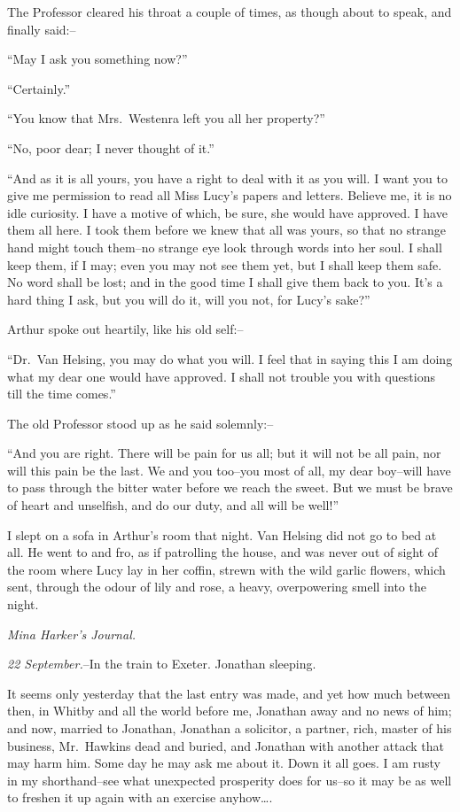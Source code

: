 \documentclass[12pt,openright]{book}
\begin{document}
The Professor cleared his throat a couple of times, as though about to speak, and finally said:–

“May I ask you something now?”

“Certainly.”

“You know that Mrs. Westenra left you all her property?”

“No, poor dear; I never thought of it.”

“And as it is all yours, you have a right to deal with it as you will. I want you to give me permission to read all Miss Lucy’s papers and letters. Believe me, it is no idle curiosity. I have a motive of which, be sure, she would have approved. I have them all here. I took them before we knew that all was yours, so that no strange hand might touch them–no strange eye look through words into her soul. I shall keep them, if I may; even you may not see them yet, but I shall keep them safe. No word shall be lost; and in the good time I shall give them back to you. It’s a hard thing I ask, but you will do it, will you not, for Lucy’s sake?”

Arthur spoke out heartily, like his old self:–

“Dr. Van Helsing, you may do what you will. I feel that in saying this I am doing what my dear one would have approved. I shall not trouble you with questions till the time comes.”

The old Professor stood up as he said solemnly:–

“And you are right. There will be pain for us all; but it will not be all pain, nor will this pain be the last. We and you too–you most of all, my dear boy–will have to pass through the bitter water before we reach the sweet. But we must be brave of heart and unselfish, and do our duty, and all will be well!”

I slept on a sofa in Arthur’s room that night. Van Helsing did not go to bed at all. He went to and fro, as if patrolling the house, and was never out of sight of the room where Lucy lay in her coffin, strewn with the wild garlic flowers, which sent, through the odour of lily and rose, a heavy, overpowering smell into the night.

\textit{Mina Harker’s Journal.}

\textit{22 September.}–In the train to Exeter. Jonathan sleeping.

It seems only yesterday that the last entry was made, and yet how much between then, in Whitby and all the world before me, Jonathan away and no news of him; and now, married to Jonathan, Jonathan a solicitor, a partner, rich, master of his business, Mr. Hawkins dead and buried, and Jonathan with another attack that may harm him. Some day he may ask me about it. Down it all goes. I am rusty in my shorthand–see what unexpected prosperity does for us–so it may be as well to freshen it up again with an exercise anyhow….
\end{document}
